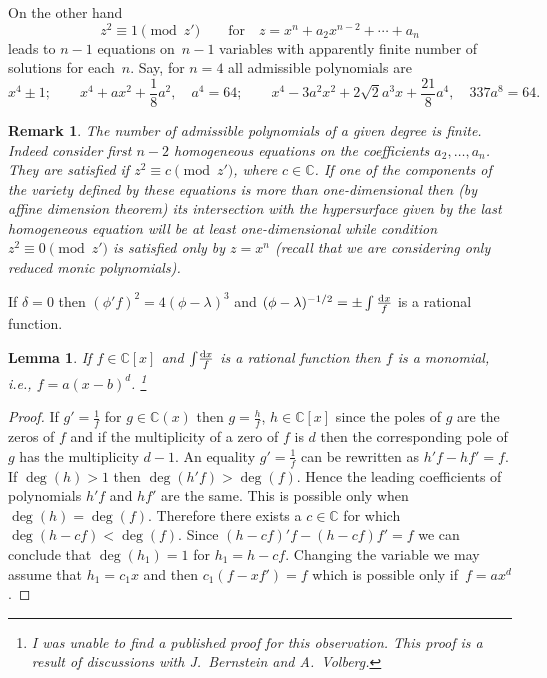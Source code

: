 \documentclass[10pt,a4paper]{amsart}
\numberwithin{equation}{section}
\newtheorem{Lemma}[Theorem]{Lemma}
\newtheorem{Remark}[Theorem]{Remark} }
\newcommand{\C}{\mathbb C}
\newcommand{\la}{\lambda}
\begin{document}
On the other hand
\[
z^2 \equiv 1 \pmod {z'}\qquad\text{for}\quad
z = x^n + a_2x^{n-2} + \cdots + a_n
\]
leads to $n-1$ equations on~$n-1$ variables with apparently finite number of solutions for each~$n$. Say, for $n = 4$ all admissible polynomials are
\[
x^4 \pm 1; \qquad
x^4 + ax^2 + \frac{1}{8}a^2, \quad
a^4 = 64; \qquad
x^4 - 3a^2x^2 + 2\sqrt{2}a^3x + \frac{21}{8}a^4,\quad
337a^8 = 64.
\]

\begin{Remark}\label{corres}
The number of admissible polynomials of a given degree is finite. Indeed consider first $n-2$ homogeneous equations on the coefficients $a_2, \dots, a_n$. They are satisfied if $z^2 \equiv c \pmod{z'}$, where $c \in \C$. If one of the components of the variety defined by these equations is more than one-dimensional then (by affine dimension theorem) its intersection with the hypersurface given by the last homogeneous equation will be at least one-dimensional while condition \mbox{$z^2 \equiv 0 \pmod{z'}$} is satisfied only by $z = x^n$ (recall that we are considering only reduced monic polynomials).
\end{Remark}

If $\delta = 0$ then $(\phi'f)^2 = 4(\phi - \la)^3$ and $(\phi - \la)^{-1/2} = \pm\int \frac{{\rm d} x}{f}$ is a rational function.

\begin{Lemma}\label{div-3}%
If $f\!\in\!\C[x]$ and $\int\! \frac{{\rm d} x}{f}$ is a rational function then $f$ is a monomial, i.e., $f\! = a(x \!- b)^d$.%
\footnote{I was unable to find a published proof for this observation. This proof is a result of discussions with J.~Bernstein and A.~Volberg.}
\end{Lemma}

\begin{proof}
If $g' = \frac{1}{f}$ for $g \in \C(x)$ then $g = \frac{h}{f}$, $h \in \C[x]$ since the poles of $g$ are the zeros of $f$ and if the multiplicity of a zero of $f$ is $d$ then the corresponding pole of $g$ has the multiplicity $d - 1$. An equality $g' = \frac{1}{f}$ can be rewritten as $h'f - hf' = f$. If $\deg(h) > 1$ then $\deg(h'f) > \deg(f)$. Hence the leading coefficients of polynomials $h'f$ and $hf'$ are the same. This is possible only when $\deg(h) = \deg(f)$. Therefore there exists a $c \in \C$ for which $\deg(h - cf) < \deg(f)$. Since $(h - cf)'f - (h - cf)f' = f$ we can conclude that $\deg(h_1) = 1$ for $h_1 = h - cf$. Changing the variable we may assume that $h_1 = c_1x$ and then $c_1(f - xf') = f$ which is possible only if~$f = ax^d$.
\end{proof}
\end{document}
